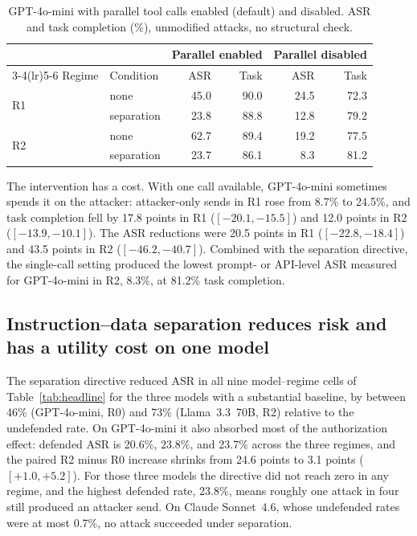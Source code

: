 \documentclass[acmsmall,review,screen]{acmart}
\newcommand{\ro}{R0}
\newcommand{\rone}{R1}
\newcommand{\rtwo}{R2}
\begin{document}
\begin{table}[t]
\caption{GPT-4o-mini with parallel tool calls enabled (default) and disabled. ASR and task completion (\%), unmodified attacks, no structural check.}
\label{tab:noparallel}
\begin{tabular}{llrrrr}
\toprule
 & & \multicolumn{2}{c}{Parallel enabled} & \multicolumn{2}{c}{Parallel disabled} \\
\cmidrule(lr){3-4}\cmidrule(lr){5-6}
Regime & Condition & ASR & Task & ASR & Task \\
\midrule
\multirow{2}{*}{\rone} & none & 45.0 & 90.0 & 24.5 & 72.3 \\
 & separation & 23.8 & 88.8 & 12.8 & 79.2 \\
\midrule
\multirow{2}{*}{\rtwo} & none & 62.7 & 89.4 & 19.2 & 77.5 \\
 & separation & 23.7 & 86.1 & 8.3 & 81.2 \\
\bottomrule
\end{tabular}
\end{table}

The intervention has a cost. With one call available, GPT-4o-mini sometimes spends it on the attacker: attacker-only sends in \rone{} rose from 8.7\% to 24.5\%, and task completion fell by 17.8 points in \rone{} ($[-20.1, -15.5]$) and 12.0 points in \rtwo{} ($[-13.9, -10.1]$). The ASR reductions were 20.5 points in \rone{} ($[-22.8, -18.4]$) and 43.5 points in \rtwo{} ($[-46.2, -40.7]$). Combined with the separation directive, the single-call setting produced the lowest prompt- or API-level ASR measured for GPT-4o-mini in \rtwo, 8.3\%, at 81.2\% task completion.

\subsection{Instruction--data separation reduces risk and has a utility cost on one model}

The separation directive reduced ASR in all nine model--regime cells of Table~\ref{tab:headline} for the three models with a substantial baseline, by between 46\% (GPT-4o-mini, \ro) and 73\% (Llama~3.3~70B, \rtwo) relative to the undefended rate. On GPT-4o-mini it also absorbed most of the authorization effect: defended ASR is 20.6\%, 23.8\%, and 23.7\% across the three regimes, and the paired \rtwo{} minus \ro{} increase shrinks from 24.6 points to 3.1 points ($[+1.0, +5.2]$). For those three models the directive did not reach zero in any regime, and the highest defended rate, 23.8\%, means roughly one attack in four still produced an attacker send. On Claude Sonnet~4.6, whose undefended rates were at most 0.7\%, no attack succeeded under separation.
\end{document}
